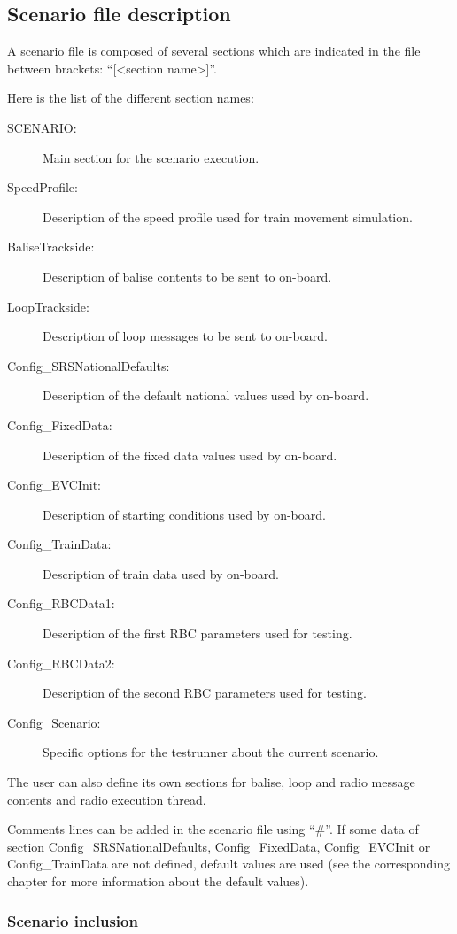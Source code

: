 \documentclass{template/openetcs}
\begin{document}
\subsection{Scenario file description}

A scenario file is composed of several sections which are indicated in the file between brackets: “[<section name>]”.

Here is the list of the different section names:

\begin{description}
	\item[SCENARIO:] Main section for the scenario execution.
	\item[SpeedProfile:] Description of the speed profile used for train movement simulation.
	\item[BaliseTrackside:] Description of balise contents to be sent to on-board.
	\item[LoopTrackside:] Description of loop messages to be sent to on-board.
	\item[Config\_SRSNationalDefaults:] Description of the default national values used by on-board.
	\item[Config\_FixedData:] Description of the fixed data values used by on-board.
	\item[Config\_EVCInit:] Description of starting conditions used by on-board.
	\item[Config\_TrainData:] Description of train data used by on-board. 
	\item[Config\_RBCData1:] Description of the first RBC parameters used for testing. 
	\item[Config\_RBCData2:] Description of the second RBC parameters used for testing. 
	\item[Config\_Scenario:] Specific options for the testrunner about the current scenario.
\end{description}

The user can also define its own sections for balise, loop and radio message contents and radio execution thread.

Comments lines can be added in the scenario file using “\#”.
If some data of section Config\_SRSNationalDefaults, Config\_FixedData, Config\_EVCInit or Config\_TrainData are not defined, default values are used (see the corresponding chapter for more information about the default values).

\subsubsection{Scenario inclusion}
\end{document}

